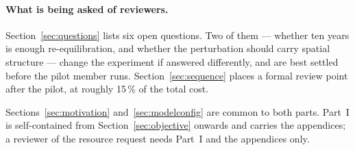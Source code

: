 \paragraph{What is being asked of reviewers.}
Section~\ref{sec:questions} lists six open questions. Two of them --- whether ten
years is enough re-equilibration, and whether the perturbation should carry
spatial structure --- change the experiment if answered differently, and are best
settled before the pilot member runs. Section~\ref{sec:sequence} places a formal
review point after the pilot, at roughly 15\,\% of the total cost.


\noindent
Sections~\ref{sec:motivation} and~\ref{sec:modelconfig} are common to both
parts. Part~I is self-contained from Section~\ref{sec:objective} onwards and
carries the appendices; a reviewer of the resource request needs Part~I and the
appendices only.

